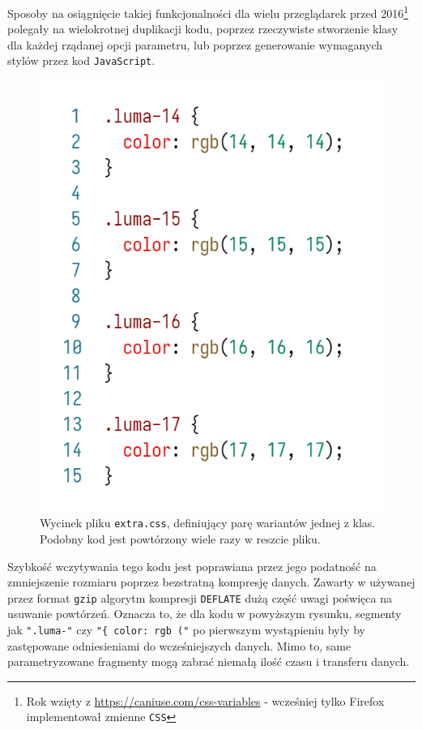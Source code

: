 \documentclass[licencjacka]{pracadypl}
\begin{document}
Sposoby na osiągnięcie takiej funkcjonalności dla wielu przeglądarek przed 2016\footnote{Rok wzięty z \url{https://caniuse.com/css-variables} - wcześniej tylko Firefox implementował zmienne \texttt{CSS}} polegały na wielokrotnej duplikacji kodu, poprzez rzeczywiste stworzenie klasy dla każdej rządanej opcji parametru, lub poprzez generowanie wymaganych stylów przez kod \texttt{JavaScript}.

\begin{figure}[H]
  \centering
  \includegraphics[width=\linewidth/\real{2.5}]{images/code-css-luma.png}
  \caption{Wycinek pliku \texttt{extra.css}, definiujący parę wariantów jednej z klas. Podobny kod jest powtórzony wiele razy w reszcie pliku.}
  \label{fig:css-css-luma}
\end{figure}

Szybkość wczytywania tego kodu jest poprawiana przez jego podatność na zmniejszenie rozmiaru poprzez bezstratną kompresję danych. Zawarty w używanej przez format \texttt{gzip} algorytm kompresji \texttt{DEFLATE} dużą część uwagi poświęca na usuwanie powtórzeń. Oznacza to, że dla kodu w powyższym rysunku, segmenty jak \texttt{".luma-"} czy \texttt{"\{ color: rgb ("} po pierwszym wystąpieniu były by zastępowane odniesieniami do wcześniejszych danych. Mimo to, same parametryzowane fragmenty mogą zabrać niemałą ilość czasu i transferu danych.
\end{document}
